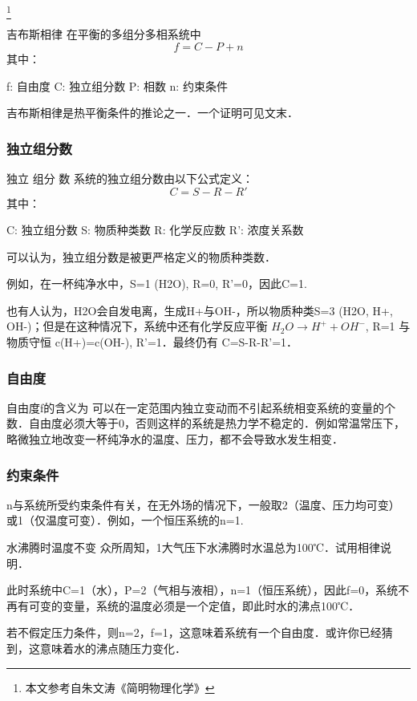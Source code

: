 
\footnote{本文参考自朱文涛《简明物理化学》}

\begin{theorem}{吉布斯相律}
在平衡的多组分多相系统中
\begin{equation}
f=C-P+n
\end{equation}
其中：

f: 自由度
C: 独立组分数
P: 相数
n: 约束条件
\end{theorem}
吉布斯相律是热平衡条件的推论之一．一个证明可见文末．

\subsubsection{独立组分数}
\begin{definition}{独立 组分 数}
系统的独立组分数由以下公式定义：
\begin{equation}
C=S-R-R'
\end{equation}
其中：

C: 独立组分数
S: 物质种类数
R: 化学反应数
R': 浓度关系数
\end{definition}

可以认为，独立组分数是被更严格定义的物质种类数．

例如，在一杯纯净水中，S=1 (H2O), R=0, R'=0，因此C=1.

也有人认为，H2O会自发电离，生成H+与OH-，所以物质种类S=3 (H2O, H+, OH-)；但是在这种情况下，系统中还有化学反应平衡 $H_2O\rightarrow H^++OH^-$, R=1 与物质守恒 c(H+)=c(OH-), R'=1．最终仍有 C=S-R-R'=1．

\subsubsection{自由度}
自由度f的含义为 可以在一定范围内独立变动而不引起系统相变系统的变量的个数．自由度必须大等于0，否则这样的系统是热力学不稳定的．例如常温常压下，略微独立地改变一杯纯净水的温度、压力，都不会导致水发生相变．

\subsubsection{约束条件}
n与系统所受约束条件有关，在无外场的情况下，一般取2（温度、压力均可变）或1（仅温度可变）．例如，一个恒压系统的n=1.

\begin{example}{水沸腾时温度不变}
众所周知，1大气压下水沸腾时水温总为100℃．试用相律说明．

此时系统中C=1（水），P=2（气相与液相），n=1（恒压系统），因此f=0，系统不再有可变的变量，系统的温度必须是一个定值，即此时水的沸点100℃．

若不假定压力条件，则n=2，f=1，这意味着系统有一个自由度．或许你已经猜到，这意味着水的沸点随压力变化．
\end{example}

